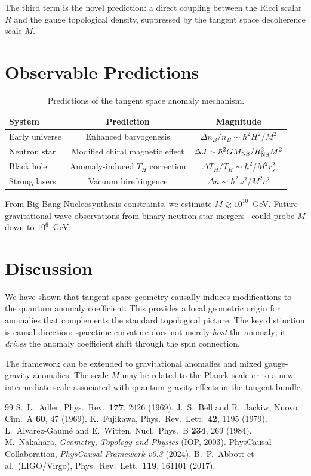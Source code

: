 \documentclass[reprint,aps,pra]{revtex4-2}
\begin{document}
The third term is the novel prediction: a direct coupling between the Ricci scalar $R$ and the 
gauge topological density, suppressed by the tangent space decoherence scale $M$.

\section{Observable Predictions}

\begin{table}[h]
\centering
\caption{Predictions of the tangent space anomaly mechanism.}
\begin{tabular}{|l|c|c|}
\hline
\textbf{System} & \textbf{Prediction} & \textbf{Magnitude} \\
\hline
Early universe & Enhanced baryogenesis & $\Delta n_B/n_B \sim \hbar^2 H^2/M^2$ \\
Neutron star & Modified chiral magnetic effect & $\Delta J \sim \hbar^2 G M_{\rm NS}/R_{\rm NS}^3 M^2$ \\
Black hole & Anomaly-induced $T_H$ correction & $\Delta T_H/T_H \sim \hbar^2/M^2 r_s^2$ \\
Strong lasers & Vacuum birefringence & $\Delta n \sim \hbar^2 \omega^2/M^2 c^2$ \\
\hline
\end{tabular}
\label{tab:predictions}
\end{table}

From Big Bang Nucleosynthesis constraints, we estimate $M \gtrsim 10^{10}$~GeV.
Future gravitational wave observations from binary neutron star mergers~\cite{abbott2017} 
could probe $M$ down to $10^6$~GeV.

\section{Discussion}

We have shown that tangent space geometry causally induces modifications to the quantum anomaly 
coefficient. This provides a local geometric origin for anomalies that complements the standard 
topological picture. The key distinction is causal direction: spacetime curvature does not merely 
\emph{host} the anomaly; it \emph{drives} the anomaly coefficient shift through the spin connection.

The framework can be extended to gravitational anomalies and mixed gauge-gravity anomalies.
The scale $M$ may be related to the Planck scale or to a new intermediate scale associated 
with quantum gravity effects in the tangent bundle.

\begin{thebibliography}{99}
 S.~L.~Adler, Phys.~Rev.~{\bf 177}, 2426 (1969).
 J.~S.~Bell and R.~Jackiw, Nuovo Cim.~A {\bf 60}, 47 (1969).
 K.~Fujikawa, Phys.~Rev.~Lett.~{\bf 42}, 1195 (1979).
 L.~Alvarez-Gaum\'e and E.~Witten, Nucl.~Phys.~B {\bf 234}, 269 (1984).
 M.~Nakahara, \emph{Geometry, Topology and Physics} (IOP, 2003).
 PhysCausal Collaboration, \emph{PhysCausal Framework v0.3} (2024).
 B.~P.~Abbott et al.\ (LIGO/Virgo), Phys.~Rev.~Lett.~{\bf 119}, 161101 (2017).
\end{thebibliography}
\end{document}

